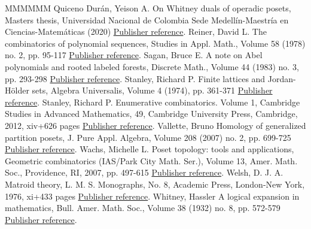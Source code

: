 \begin{thebibliography}{MMMMMM}
 Quiceno Durán, Yeison A. On Whitney duals of operadic posets, Masters thesis, Universidad Nacional de Colombia Sede Medellín-Maestría en Ciencias-Matemáticas (2020) \href{https://alco.centre-mersenne.org/articles/10.5802/alco.455/#QuicenoDuran2020}{Publisher reference}.
 Reiner, David L. The combinatorics of polynomial sequences, Studies in Appl. Math., Volume 58 (1978) no. 2, pp. 95-117 \href{https://alco.centre-mersenne.org/articles/10.5802/alco.455/#Reiner1978}{Publisher reference}.
 Sagan, Bruce E. A note on Abel polynomials and rooted labeled forests, Discrete Math., Volume 44 (1983) no. 3, pp. 293-298 \href{https://alco.centre-mersenne.org/articles/10.5802/alco.455/#Sagan1983}{Publisher reference}.
 Stanley, Richard P. Finite lattices and Jordan-Hölder sets, Algebra Universalis, Volume 4 (1974), pp. 361-371 \href{https://alco.centre-mersenne.org/articles/10.5802/alco.455/#Stanley1974}{Publisher reference}.
 Stanley, Richard P. Enumerative combinatorics. Volume 1, Cambridge Studies in Advanced Mathematics, 49, Cambridge University Press, Cambridge, 2012, xiv+626 pages \href{https://alco.centre-mersenne.org/articles/10.5802/alco.455/#Stanley2012}{Publisher reference}.
 Vallette, Bruno Homology of generalized partition posets, J. Pure Appl. Algebra, Volume 208 (2007) no. 2, pp. 699-725 \href{https://alco.centre-mersenne.org/articles/10.5802/alco.455/#Vallette2007}{Publisher reference}.
 Wachs, Michelle L. Poset topology: tools and applications, Geometric combinatorics (IAS/Park City Math. Ser.), Volume 13, Amer. Math. Soc., Providence, RI, 2007, pp. 497-615 \href{https://alco.centre-mersenne.org/articles/10.5802/alco.455/#Wachs2007}{Publisher reference}.
 Welsh, D. J. A. Matroid theory, L. M. S. Monographs, No. 8, Academic Press, London-New York, 1976, xi+433 pages \href{https://alco.centre-mersenne.org/articles/10.5802/alco.455/#Welsh1976}{Publisher reference}.
 Whitney, Hassler A logical expansion in mathematics, Bull. Amer. Math. Soc., Volume 38 (1932) no. 8, pp. 572-579 \href{https://alco.centre-mersenne.org/articles/10.5802/alco.455/#Whitney1932}{Publisher reference}.
\end{thebibliography}
